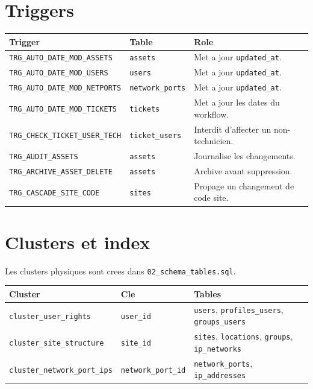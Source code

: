\documentclass[11pt,a4paper]{article}
\begin{document}
\section{Triggers}

\begin{longtable}{|p{5cm}|p{3cm}|p{6cm}|}
\hline
\textbf{Trigger} & \textbf{Table} & \textbf{Role} \\
\hline
\texttt{TRG\_AUTO\_DATE\_MOD\_ASSETS} & \texttt{assets} & Met a jour \texttt{updated\_at}. \\
\hline
\texttt{TRG\_AUTO\_DATE\_MOD\_USERS} & \texttt{users} & Met a jour \texttt{updated\_at}. \\
\hline
\texttt{TRG\_AUTO\_DATE\_MOD\_NETPORTS} & \texttt{network\_ports} & Met a jour \texttt{updated\_at}. \\
\hline
\texttt{TRG\_AUTO\_DATE\_MOD\_TICKETS} & \texttt{tickets} & Met a jour les dates du workflow. \\
\hline
\texttt{TRG\_CHECK\_TICKET\_USER\_TECH} & \texttt{ticket\_users} & Interdit d'affecter un non-technicien. \\
\hline
\texttt{TRG\_AUDIT\_ASSETS} & \texttt{assets} & Journalise les changements. \\
\hline
\texttt{TRG\_ARCHIVE\_ASSET\_DELETE} & \texttt{assets} & Archive avant suppression. \\
\hline
\texttt{TRG\_CASCADE\_SITE\_CODE} & \texttt{sites} & Propage un changement de code site. \\
\hline
\end{longtable}

\section{Clusters et index}

Les clusters physiques sont crees dans \texttt{02\_schema\_tables.sql}.

\begin{longtable}{|p{5cm}|p{3cm}|p{6cm}|}
\hline
\textbf{Cluster} & \textbf{Cle} & \textbf{Tables} \\
\hline
\texttt{cluster\_user\_rights} & \texttt{user\_id} & \texttt{users}, \texttt{profiles\_users}, \texttt{groups\_users} \\
\hline
\texttt{cluster\_site\_structure} & \texttt{site\_id} & \texttt{sites}, \texttt{locations}, \texttt{groups}, \texttt{ip\_networks} \\
\hline
\texttt{cluster\_network\_port\_ips} & \texttt{network\_port\_id} & \texttt{network\_ports}, \texttt{ip\_addresses} \\
\hline
\end{longtable}
\end{document}
